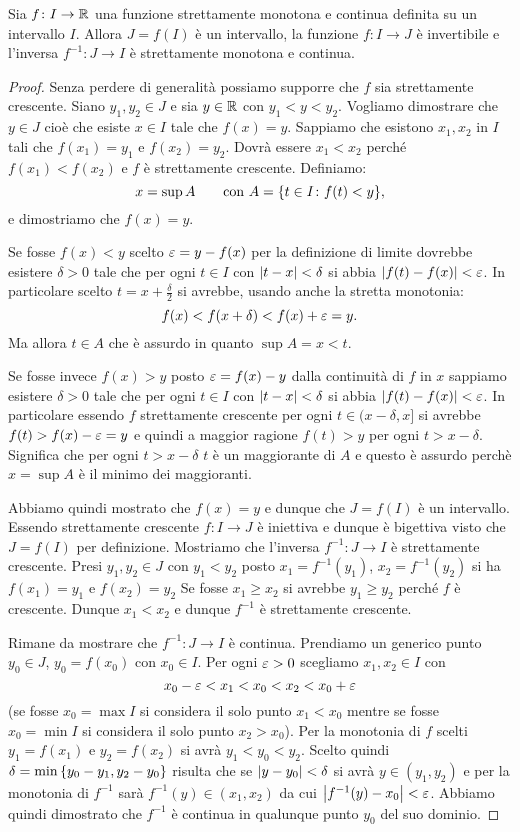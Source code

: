 \begin{theorem}
\label{th:inversa_continua}%
\mymark{*}%
%
Sia $f\colon I\to \mathbb R$ una funzione strettamente monotona
e continua definita su un intervallo $I$.
Allora $J=f(I)$ è un intervallo, la funzione $f\colon I \to J$
è invertibile e l'inversa $f^{-1}\colon J\to I$
è strettamente monotona e continua.
\end{theorem}
%
\begin{proof}
Senza perdere di generalità possiamo supporre che $f$
sia strettamente crescente.
Siano $y_1, y_2 \in J$ e sia $y\in \mathbb R$
con $y_1 < y < y_2$.
Vogliamo dimostrare che $y\in J$ cioè che esiste $x\in I$
tale che $f(x)=y$.
Sappiamo che esistono $x_1,x_2$ in $I$ tali che
$f(x_1) = y_1$ e $f(x_2) = y_2$.
Dovrà essere $x_1<x_2$ perché $f(x_1)<f(x_2)$ e
$f$ è strettamente crescente.
Definiamo:
\[
 x = \sup A
\qquad
\text{con } A={\left\{ t\in I\colon f(t)<y \right\}},
\]
e dimostriamo che $f(x)=y$.

Se fosse $f(x)<y$ scelto $\varepsilon = y-f(x)$
per la definizione di limite dovrebbe esistere
$\delta>0$ tale che per ogni $t\in I$ con ${\left|t-x\right|}<\delta$
si abbia ${\left|f(t)-f(x)\right|}<\varepsilon$.
In particolare scelto $t=x+\frac \delta 2$
si avrebbe, usando anche la stretta monotonia:
\[
   f(x) < f(x+\delta) < f(x) + \varepsilon = y.
\]
Ma allora $t\in A$ che è assurdo in quanto
$\sup A = x < t$.

Se fosse invece $f(x)>y$ posto $\varepsilon = f(x)-y$
dalla continuità di $f$ in $x$ sappiamo
esistere $\delta>0$ tale che per ogni $t\in I$
con ${\left|t-x\right|}<\delta$ si abbia ${\left|f(t)-f(x)\right|}<\varepsilon$.
In particolare essendo $f$ strettamente crescente
per ogni $t\in (x-\delta,x]$
si avrebbe $f(t)>f(x)-\varepsilon = y$ e
quindi a maggior ragione
$f(t) > y$ per ogni $t>x-\delta$.
Significa che per ogni $t>x-\delta$
$t$ è un maggiorante di $A$ e questo è
assurdo perchè $x=\sup A$ è il minimo dei maggioranti.

Abbiamo quindi mostrato che $f(x)=y$ e dunque
che $J=f(I)$ è un intervallo.
Essendo strettamente crescente $f\colon I \to J$
è iniettiva e dunque è bigettiva visto che $J=f(I)$
per definizione.
Mostriamo che l'inversa $f^{-1}\colon J \to I$
è strettamente crescente.
Presi $y_1,y_2\in J$
con $y_1<y_2$ posto
$x_1=f^{-1}(y_1)$, $x_2 = f^{-1}(y_2)$
si ha $f(x_1)=y_1$ e $f(x_2)=y_2$
Se fosse $x_1 \ge x_2$ si avrebbe $y_1 \ge y_2$
perché $f$ è crescente. Dunque $x_1<x_2$
e dunque $f^{-1}$ è strettamente crescente.

Rimane da mostrare che $f^{-1}\colon J \to I$
è continua.
Prendiamo un generico punto $y_0\in J$, $y_0=f(x_0)$
con $x_0\in I$.
Per ogni $\varepsilon>0$
scegliamo $x_1,x_2\in I$ con
\[
 x_0-\varepsilon < x_1 < x_0 < x_2 < x_0+\varepsilon
\]
(se fosse $x_0=\max I$ si considera il solo punto $x_1<x_0$
mentre se fosse $x_0 = \min I$ si considera il solo punto
$x_2>x_0$).
Per la monotonia di $f$ scelti $y_1=f(x_1)$ e $y_2=f(x_2)$
si avrà $y_1 < y_0 < y_2$.
Scelto quindi $\delta = \min{\left\{ y_0-y_1,y_2-y_0 \right\}}$
risulta che se ${\left|y-y_0\right|}<\delta$ si avrà
$y\in(y_1,y_2)$ e per la monotonia di $f^{-1}$
sarà $f^{-1}(y)\in(x_1,x_2)$ da cui ${\left|f^{-1}(y)-x_0\right|}<\varepsilon$.
Abbiamo quindi dimostrato che $f^{-1}$ è continua
in qualunque punto $y_0$ del suo dominio.
\end{proof}

